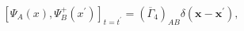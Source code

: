 \begin{equation}
\left[ \Psi _A(x),\Psi^+ _B(x^{\prime })\right] _{t=t^{\prime
}}=\left( \overline{\Gamma} _4\right) _{AB}\delta
(\mathbf{x}-\mathbf{x}^{\prime }) ,\label{83}
\end{equation}

